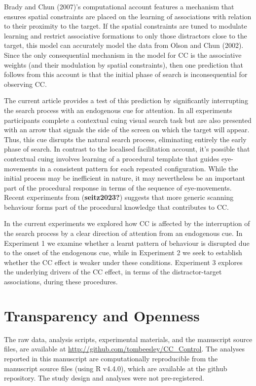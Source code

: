 \documentclass[
  man,
  floatsintext,
  longtable,
  nolmodern,
  notxfonts,
  notimes,
  colorlinks=true,linkcolor=blue,citecolor=blue,urlcolor=blue]{apa7}
\begin{document}
Brady and Chun (2007)'s computational account features a mechanism that
ensures spatial constraints are placed on the learning of associations
with relation to their proximity to the target. If the spatial
constraints are tuned to modulate learning and restrict associative
formations to only those distractors close to the target, this model can
accurately model the data from Olson and Chun (2002). Since the only
consequential mechanism in the model for CC is the associative weights
(and their modulation by spatial constraints), then one prediction that
follows from this account is that the initial phase of search is
inconsequential for observing CC.

The current article provides a test of this prediction by significantly
interrupting the search process with an endogenous cue for attention. In
all experiments participants complete a contextual cuing visual search
task but are also presented with an arrow that signals the side of the
screen on which the target will appear. Thus, this cue disrupts the
natural search process, eliminating entirely the early phase of search.
In contrast to the localised facilitation account, it's possible that
contextual cuing involves learning of a procedural template that guides
eye-movements in a consistent pattern for each repeated configuration.
While the initial process may be inefficient in nature, it may
nevertheless be an important part of the procedural response in terms of
the sequence of eye-movements. Recent experiments from
(\textbf{seitz2023?}) suggests that more generic scanning behaviour
forms part of the procedural knowledge that contributes to CC.

In the current experiments we explored how CC is affected by the
interruption of the search process by a clear direction of attention
from an endogenous cue. In Experiment 1 we examine whether a learnt
pattern of behaviour is disrupted due to the onset of the endogenous
cue, while in Experiment 2 we seek to establish whether the CC effect is
weaker under these conditions. Experiment 3 explores the underlying
drivers of the CC effect, in terms of the distractor-target
associations, during these procedures.

\section{Transparency and Openness}\label{transparency-and-openness}

The raw data, analysis scripts, experimental materials, and the
manuscript source files, are available at
\url{http://github.com/tombeesley/CC_Control}. The analyses reported in
this manuscript are computationally reproducible from the manuscript
source files (using R v4.4.0), which are available at the github
repository. The study design and analyses were not pre-registered.
\end{document}
